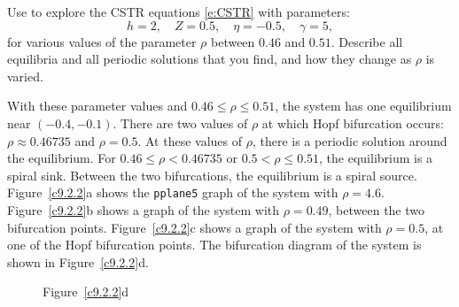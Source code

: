\documentclass{ximera}
\begin{document}
\begin{computerExercise} \label{c9.2.2}
Use {\pplane} to explore the CSTR equations \eqref{e:CSTR} with
parameters:
\[
h=2, \quad Z=0.5, \quad \eta=-0.5, \quad \gamma=5,
\]
for various values of the parameter $\rho$ between $0.46$ and 
$0.51$.  Describe all equilibria and all periodic solutions that 
you find, and how they change as $\rho$ is varied.

\begin{solution}

With these parameter values and $0.46 \leq \rho \leq 0.51$, the system
has one equilibrium near $(-0.4,-0.1)$.  There are two values of $\rho$
at which Hopf bifurcation occurs: $\rho \approx 0.46735$ and
$\rho = 0.5$.  At these values of $\rho$, there is a periodic solution
around the equilibrium.  For $0.46 \leq \rho < 0.46735$ or $0.5 < \rho
\leq 0.51$, the equilibrium is a spiral sink.  Between the two
bifurcations, the equilibrium is a spiral source.  Figure~\ref{c9.2.2}a
shows the {\tt pplane5} graph of the system with $\rho = 4.6$. 
Figure~\ref{c9.2.2}b shows a graph of the system with $\rho = 0.49$,
between the two bifurcation points.  Figure~\ref{c9.2.2}c shows a graph
of the system with $\rho = 0.5$, at one of the Hopf bifurcation points.
The bifurcation diagram of the system is shown in Figure~\ref{c9.2.2}d.

\begin{figure}[htb]
                       \centerline{%
                       }
\end{figure}

\begin{figure}[htb]
			\centerline{%
			}
		\centerline{Figure~\ref{c9.2.2}d}
\end{figure}




\end{solution}
\end{computerExercise}
\end{document}
